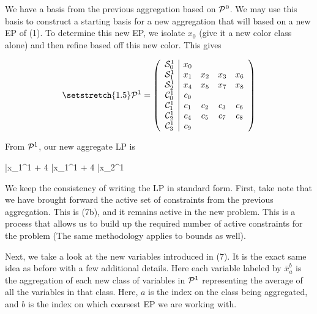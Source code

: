 \documentclass[11pt]{article} %
\newcommand{\cP}{{\cal P}}
\newcommand{\cC}{{\cal C}}
\newcommand{\cS}{{\cal S}}
\begin{document}
	We have a basis from the previous aggregation based on $\cP^0$.  We  may use this basis to construct a starting basis for a new aggregation that will based on a new EP of (1).  To determine this new EP, we isolate $x_0$ (give it a new color class alone) and then refine based off this new color.  This gives
	
	\begin{equation}\setstretch{1.5}
	\mathcal{P}^1 = 
	\begin{pmatrix}
	\begin{array}{c|cccc}
	\cS_0^1 & x_0 &&& \\
	\cS_1^1 & x_1 & x_2 & x_3 & x_6 \\
	\cS_2^1& x_4 & x_5 & x_7 & x_8 \\
	\cC_0^1 & c_0 &&& \\
	\cC_1^1 & c_1 & c_2 & c_3 & c_6 \\
	\cC_2^1 & c_4 & c_5 & c_7 & c_8 \\
	\cC_3^1 & c_9 &&&
 	\end{array}
	\end{pmatrix}
	\end{equation}
	
	From $\cP^1$, our new aggregate LP is 
	
	\begin{mini!}
		{}{\bar{x}_1^1 + 4 \bar{x}_1^1 + 4 \bar{x}_2^1}{}{}
	\end{mini!}

	We keep the consistency of writing the LP in standard form.  First, take note that we have brought forward the active set of constraints from the previous aggregation.  This is (7b), and it remains active in the new problem.  This is a process that allows us to build up the required number of active constraints for the problem (The same methodology applies to bounds as well).
	
	Next, we take a look at the new variables introduced in (7).  It is the exact same idea as before with a few additional details.  Here each variable labeled by $\bar{x}_a^b$ is the aggregation of each new class of variables in $\cP^1$ representing the average of all the variables in that class.  Here, $a$ is the index on the class being aggregated, and $b$ is the index on which coarsest EP we are working with.  
	
\end{document}
